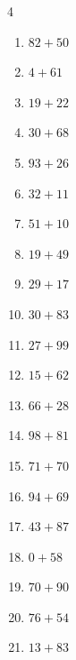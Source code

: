 \begin{multicols}{4}
\begin{enumerate}
  \item $82+50$
        \phantom{$=132$}

  \item $4+61$
        \phantom{$=65$}

  \item $19+22$
        \phantom{$=41$}

  \item $30+68$
        \phantom{$=98$}

  \item $93+26$
        \phantom{$=119$}

  \item $32+11$
        \phantom{$=43$}

  \item $51+10$
        \phantom{$=61$}

  \item $19+49$
        \phantom{$=68$}

  \item $29+17$
        \phantom{$=46$}

  \item $30+83$
        \phantom{$=113$}

  \item $27+99$
        \phantom{$=126$}

  \item $15+62$
        \phantom{$=77$}

  \item $66+28$
        \phantom{$=94$}

  \item $98+81$
        \phantom{$=179$}

  \item $71+70$
        \phantom{$=141$}

  \item $94+69$
        \phantom{$=163$}

  \item $43+87$
        \phantom{$=130$}

  \item $0+58$
        \phantom{$=58$}

  \item $70+90$
        \phantom{$=160$}

  \item $76+54$
        \phantom{$=130$}

\columnbreak %

\resetques

  \item $13+83$
        \phantom{$=96$}


\end{enumerate}
\end{multicols}
